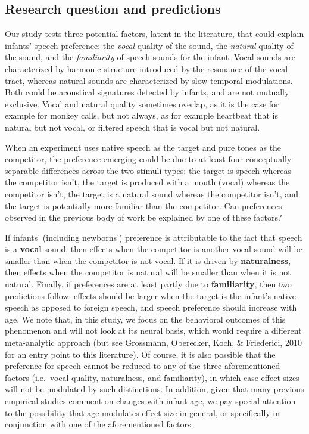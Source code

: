 \documentclass[
  man,mask,floatsintext]{apa6}
\begin{document}
\hypertarget{research-question-and-predictions}{%
\subsection{Research question and predictions}\label{research-question-and-predictions}}

Our study tests three potential factors, latent in the literature, that could explain infants' speech preference: the \emph{vocal} quality of the sound, the \emph{natural} quality of the sound, and the \emph{familiarity} of speech sounds for the infant. Vocal sounds are characterized by harmonic structure introduced by the resonance of the vocal tract, whereas natural sounds are characterized by slow temporal modulations. Both could be acoustical signatures detected by infants, and are not mutually exclusive. Vocal and natural quality sometimes overlap, as it is the case for example for monkey calls, but not always, as for example heartbeat that is natural but not vocal, or filtered speech that is vocal but not natural.

When an experiment uses native speech as the target and pure tones as the competitor, the preference emerging could be due to at least four conceptually separable differences across the two stimuli types: the target is speech whereas the competitor isn't, the target is produced with a mouth (vocal) whereas the competitor isn't, the target is a natural sound whereas the competitor isn't, and the target is potentially more familiar than the competitor. Can preferences observed in the previous body of work be explained by one of these factors?

If infants' (including newborns') preference is attributable to the fact that speech is a \textbf{vocal} sound, then effects when the competitor is another vocal sound will be smaller than when the competitor is not vocal. If it is driven by \textbf{naturalness}, then effects when the competitor is natural will be smaller than when it is not natural. Finally, if preferences are at least partly due to \textbf{familiarity}, then two predictions follow: effects should be larger when the target is the infant's native speech as opposed to foreign speech, and speech preference should increase with age. We note that, in this study, we focus on the behavioral outcomes of this phenomenon and will not look at its neural basis, which would require a different meta-analytic approach (but see Grossmann, Oberecker, Koch, \& Friederici, 2010 for an entry point to this literature). Of course, it is also possible that the preference for speech cannot be reduced to any of the three aforementioned factors (i.e.~vocal quality, naturalness, and familiarity), in which case effect sizes will not be modulated by such distinctions. In addition, given that many previous empirical studies comment on changes with infant age, we pay special attention to the possibility that age modulates effect size in general, or specifically in conjunction with one of the aforementioned factors.
\end{document}
